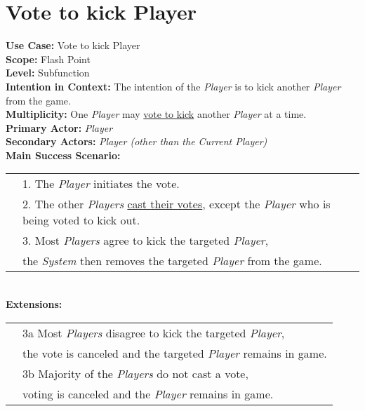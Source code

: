 \documentclass{article}
\begin{document}
	\section*{Vote to kick Player}
	\textbf{Use Case:} Vote to kick Player\\
	\textbf{Scope:} Flash Point\\
	\textbf{Level:} Subfunction\\
	\textbf{Intention in Context:} The intention of the \textit{Player} is to kick another \textit{Player} from the game.\\
	\textbf{Multiplicity: } One \textit{Player} may \underline{vote to kick} another \textit{Player} at a time.\\
	\textbf{Primary Actor:} \textit{Player}\\
	\textbf{Secondary Actors:} \textit{Player (other than the Current Player)}\\
	\textbf{Main Success Scenario:}\\
	\begin{tabular}{l l}
		&1. The \textit{Player} initiates the vote.\\
		&2. The other \textit{Players} \underline{cast their votes}, except the \textit{Player} who is being voted to kick out.\\
		&3. Most \textit{Players} agree to kick the targeted \textit{Player},\\
		&\qquad the \textit{System} then removes the targeted \textit{Player} from the game.
	\end{tabular}\\
	\textbf{Extensions: }\\
	\begin{tabular}{l l}
		&3a Most \textit{Players} disagree to kick the targeted \textit{Player},\\
		&\qquad the vote is canceled and the targeted \textit{Player} remains in game.\\
		&3b Majority of the \textit{Players} do not cast a vote,\\
		&\qquad voting is canceled and the \textit{Player} remains in game.
	\end{tabular}
\end{document}

